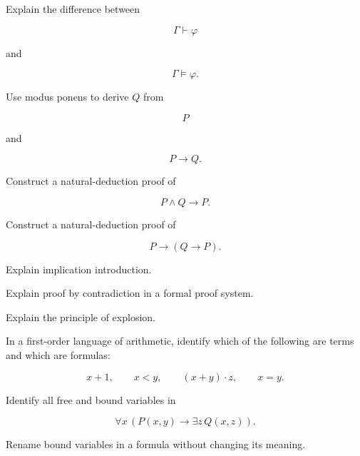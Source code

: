 \begin{exercise}[2]
Explain the difference between

\[
\Gamma\vdash\varphi
\]

and

\[
\Gamma\models\varphi.
\]
\end{exercise}

\begin{exercise}[2]
Use modus ponens to derive \(Q\) from

\[
P
\]

and

\[
P\rightarrow Q.
\]
\end{exercise}

\begin{exercise}[3]
Construct a natural-deduction proof of

\[
P\land Q
\rightarrow
P.
\]
\end{exercise}

\begin{exercise}[3]
Construct a natural-deduction proof of

\[
P
\rightarrow
(Q\rightarrow P).
\]
\end{exercise}

\begin{exercise}[3]
Explain implication introduction.
\end{exercise}

\begin{exercise}[3]
Explain proof by contradiction in a formal proof system.
\end{exercise}

\begin{exercise}[3]
Explain the principle of explosion.
\end{exercise}

\begin{exercise}[2]
In a first-order language of arithmetic, identify which of the following
are terms and which are formulas:

\[
x+1,
\qquad
x<y,
\qquad
(x+y)\cdot z,
\qquad
x=y.
\]
\end{exercise}

\begin{exercise}[2]
Identify all free and bound variables in

\[
\forall x
\,
(P(x,y)\rightarrow\exists z\,Q(x,z)).
\]
\end{exercise}

\begin{exercise}[3]
Rename bound variables in a formula without changing its meaning.
\end{exercise}

